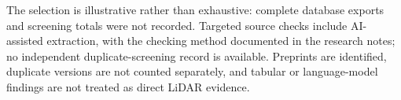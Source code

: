 
The selection is illustrative rather than exhaustive: complete database
exports and screening totals were not recorded. Targeted source checks
include AI-assisted extraction, with the checking method documented in the
research notes; no independent duplicate-screening record is available.
Preprints are identified, duplicate
versions are not counted separately, and tabular or language-model findings
are not treated as direct LiDAR evidence.
